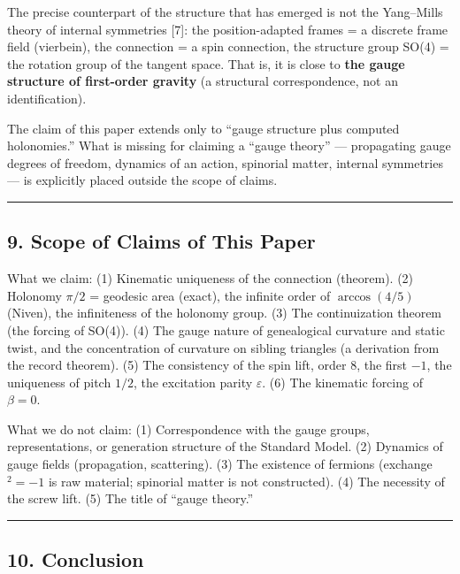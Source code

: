 \documentclass[
]{article}
\begin{document}
The precise counterpart of the structure that has emerged is not the
Yang--Mills theory of internal symmetries {[}7{]}: the position-adapted
frames = a discrete frame field (vierbein), the connection = a spin
connection, the structure group SO(4) = the rotation group of the
tangent space. That is, it is close to \textbf{the gauge structure of
first-order gravity} (a structural correspondence, not an
identification).

The claim of this paper extends only to ``gauge structure plus computed
holonomies.'' What is missing for claiming a ``gauge theory'' ---
propagating gauge degrees of freedom, dynamics of an action, spinorial
matter, internal symmetries --- is explicitly placed outside the scope
of claims.

\begin{center}\rule{0.5\linewidth}{0.5pt}\end{center}

\subsection{9. Scope of Claims of This
Paper}\label{scope-of-claims-of-this-paper}

What we claim: (1) Kinematic uniqueness of the connection (theorem). (2)
Holonomy \(\pi/2\) = geodesic area (exact), the infinite order of
\(\arccos(4/5)\) (Niven), the infiniteness of the holonomy group. (3)
The continuization theorem (the forcing of SO(4)). (4) The gauge nature
of genealogical curvature and static twist, and the concentration of
curvature on sibling triangles (a derivation from the record theorem).
(5) The consistency of the spin lift, order 8, the first \(-1\), the
uniqueness of pitch \(1/2\), the excitation parity \(\varepsilon\). (6)
The kinematic forcing of \(\beta=0\).

What we do not claim: (1) Correspondence with the gauge groups,
representations, or generation structure of the Standard Model. (2)
Dynamics of gauge fields (propagation, scattering). (3) The existence of
fermions (exchange\(^2=-1\) is raw material; spinorial matter is not
constructed). (4) The necessity of the screw lift. (5) The title of
``gauge theory.''

\begin{center}\rule{0.5\linewidth}{0.5pt}\end{center}

\subsection{10. Conclusion}\label{conclusion}
\end{document}
